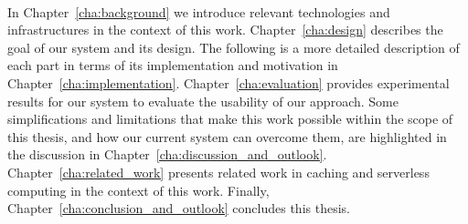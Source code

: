 ~\\
In Chapter~\ref{cha:background} we introduce relevant technologies and infrastructures in the context of this work. Chapter~\ref{cha:design} describes the goal of our system and its design. The following is a more detailed description of each part in terms of its implementation and motivation in Chapter~\ref{cha:implementation}. Chapter~\ref{cha:evaluation} provides experimental results for our system to evaluate the usability of our approach. Some simplifications and limitations that make this work possible within the scope of this thesis, and how our current system can overcome them, are highlighted in the discussion in Chapter~\ref{cha:discussion_and_outlook}. Chapter~\ref{cha:related_work} presents related work in caching and serverless computing in the context of this work. Finally, Chapter~\ref{cha:conclusion_and_outlook} concludes this thesis.


